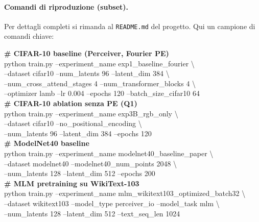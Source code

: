 \documentclass[
  11pt,
]{article}
\begin{document}
\paragraph{Comandi di riproduzione (subset).} Per dettagli completi si rimanda al \texttt{README.md} del progetto. Qui un campione di comandi chiave:

\begin{tcolorbox}[colback=gray!5, colframe=gray!40, boxrule=0.5pt, arc=2pt, left=6pt, right=6pt, top=4pt, bottom=4pt, fontupper=\ttfamily\footnotesize]
\textbf{\# CIFAR-10 baseline (Perceiver, Fourier PE)} \\
python train.py --experiment\_name exp1\_baseline\_fourier \textbackslash \\
\hspace*{1em}--dataset cifar10 --num\_latents 96 --latent\_dim 384 \textbackslash \\
\hspace*{1em}--num\_cross\_attend\_stages 4 --num\_transformer\_blocks 4 \textbackslash \\
\hspace*{1em}--optimizer lamb --lr 0.004 --epochs 120 --batch\_size\_cifar10 64 \\[6pt]

\textbf{\# CIFAR-10 ablation senza PE (Q1)} \\
python train.py --experiment\_name exp3B\_rgb\_only \textbackslash \\
\hspace*{1em}--dataset cifar10 --no\_positional\_encoding \textbackslash \\
\hspace*{1em}--num\_latents 96 --latent\_dim 384 --epochs 120 \\[6pt]

\textbf{\# ModelNet40 baseline} \\
python train.py --experiment\_name modelnet40\_baseline\_paper \textbackslash \\
\hspace*{1em}--dataset modelnet40 --modelnet40\_num\_points 2048 \textbackslash \\
\hspace*{1em}--num\_latents 128 --latent\_dim 512 --epochs 200 \\[6pt]

\textbf{\# MLM pretraining su WikiText-103} \\
python train.py --experiment\_name mlm\_wikitext103\_optimized\_batch32 \textbackslash \\
\hspace*{1em}--dataset wikitext103 --model\_type perceiver\_io --model\_task mlm \textbackslash \\
\hspace*{1em}--num\_latents 128 --latent\_dim 512 --text\_seq\_len 1024 \\[6pt]


\end{tcolorbox}
\end{document}
